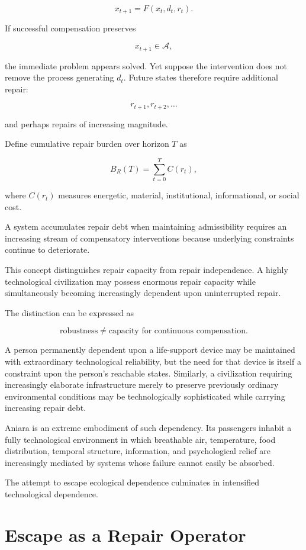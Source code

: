 \documentclass[11pt,oneside]{book}
\theoremstyle{definition}
\theoremstyle{remark}
\newcommand{\A}{\mathcal{A}}
\begin{document}
\[
x_{t+1}
=
F(x_t,d_t,r_t).
\]

If successful compensation preserves

\[
x_{t+1}\in\A,
\]

the immediate problem appears solved. Yet suppose the intervention does not remove the process generating \(d_t\). Future states therefore require additional repair:

\[
r_{t+1},r_{t+2},\ldots
\]

and perhaps repairs of increasing magnitude.

Define cumulative repair burden over horizon \(T\) as

\[
B_R(T)
=
\sum_{t=0}^{T}
C(r_t),
\]

where \(C(r_t)\) measures energetic, material, institutional, informational, or social cost.

A system accumulates repair debt when maintaining admissibility requires an increasing stream of compensatory interventions because underlying constraints continue to deteriorate.

This concept distinguishes repair capacity from repair independence. A highly technological civilization may possess enormous repair capacity while simultaneously becoming increasingly dependent upon uninterrupted repair.

The distinction can be expressed as

\[
\text{robustness}
\neq
\text{capacity for continuous compensation}.
\]

A person permanently dependent upon a life-support device may be maintained with extraordinary technological reliability, but the need for that device is itself a constraint upon the person's reachable states. Similarly, a civilization requiring increasingly elaborate infrastructure merely to preserve previously ordinary environmental conditions may be technologically sophisticated while carrying increasing repair debt.

Aniara is an extreme embodiment of such dependency. Its passengers inhabit a fully technological environment in which breathable air, temperature, food distribution, temporal structure, information, and psychological relief are increasingly mediated by systems whose failure cannot easily be absorbed.

The attempt to escape ecological dependence culminates in intensified technological dependence.

\section{Escape as a Repair Operator}
\end{document}
